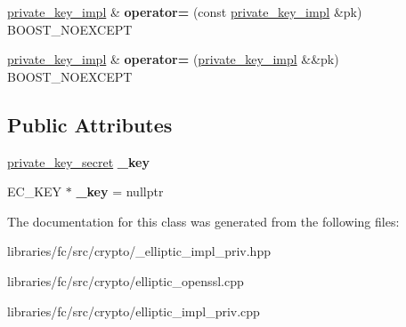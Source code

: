 \begin{DoxyCompactItemize}
\item 
\mbox{\label{classfc_1_1ecc_1_1detail_1_1private__key__impl_af2f742f4bc1287551dedcf474585294e}} 
\mbox{\hyperlink{classfc_1_1ecc_1_1detail_1_1private__key__impl}{private\+\_\+key\+\_\+impl}} \& {\bfseries operator=} (const \mbox{\hyperlink{classfc_1_1ecc_1_1detail_1_1private__key__impl}{private\+\_\+key\+\_\+impl}} \&pk) B\+O\+O\+S\+T\+\_\+\+N\+O\+E\+X\+C\+E\+PT
\item 
\mbox{\label{classfc_1_1ecc_1_1detail_1_1private__key__impl_adf87db70bfab355444eabc980a38552b}} 
\mbox{\hyperlink{classfc_1_1ecc_1_1detail_1_1private__key__impl}{private\+\_\+key\+\_\+impl}} \& {\bfseries operator=} (\mbox{\hyperlink{classfc_1_1ecc_1_1detail_1_1private__key__impl}{private\+\_\+key\+\_\+impl}} \&\&pk) B\+O\+O\+S\+T\+\_\+\+N\+O\+E\+X\+C\+E\+PT
\end{DoxyCompactItemize}
\subsection*{Public Attributes}
\begin{DoxyCompactItemize}
\item 
\mbox{\label{classfc_1_1ecc_1_1detail_1_1private__key__impl_aa66af36dbc6c4ac5b6fe144adcf36703}} 
\mbox{\hyperlink{classfc_1_1sha256}{private\+\_\+key\+\_\+secret}} {\bfseries \+\_\+key}
\item 
\mbox{\label{classfc_1_1ecc_1_1detail_1_1private__key__impl_af7dd524cbabce33f2f875f98b3fe104d}} 
E\+C\+\_\+\+K\+EY $\ast$ {\bfseries \+\_\+key} = nullptr
\end{DoxyCompactItemize}


The documentation for this class was generated from the following files\+:\begin{DoxyCompactItemize}
\item 
libraries/fc/src/crypto/\+\_\+elliptic\+\_\+impl\+\_\+priv.\+hpp\item 
libraries/fc/src/crypto/elliptic\+\_\+openssl.\+cpp\item 
libraries/fc/src/crypto/elliptic\+\_\+impl\+\_\+priv.\+cpp\end{DoxyCompactItemize}
